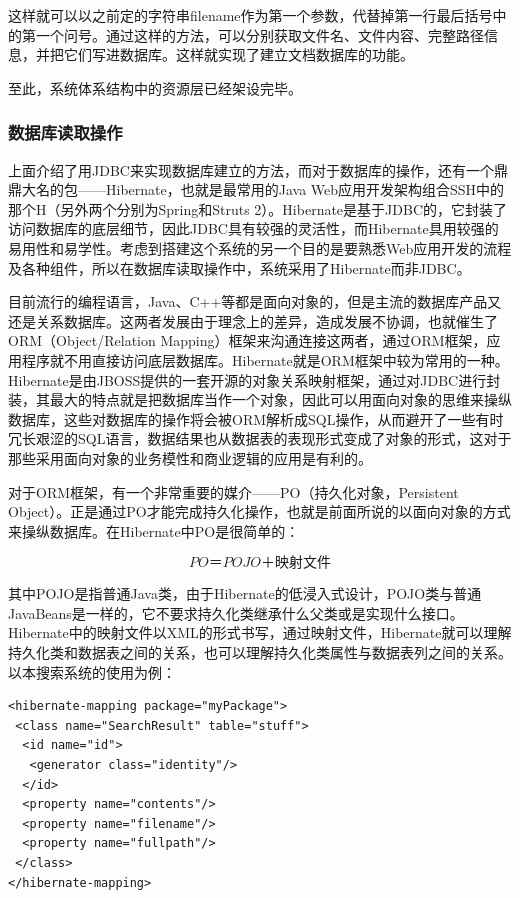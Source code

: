 \documentclass[12pt,a4paper]{article}
\begin{document}
	这样就可以以之前定的字符串filename作为第一个参数，代替掉第一行最后括号中的第一个问号。通过这样的方法，可以分别获取文件名、文件内容、完整路径信息，并把它们写进数据库。这样就实现了建立文档数据库的功能。
	
	至此，系统体系结构中的资源层已经架设完毕。

		\subsubsection{数据库读取操作}
	上面介绍了用JDBC来实现数据库建立的方法，而对于数据库的操作，还有一个鼎鼎大名的包——Hibernate，也就是最常用的Java Web应用开发架构组合SSH中的那个H（另外两个分别为Spring和Struts 2）。Hibernate是基于JDBC的，它封装了访问数据库的底层细节，因此JDBC具有较强的灵活性，而Hibernate具用较强的易用性和易学性。考虑到搭建这个系统的另一个目的是要熟悉Web应用开发的流程及各种组件，所以在数据库读取操作中，系统采用了Hibernate而非JDBC。
	
	目前流行的编程语言，Java、C++等都是面向对象的，但是主流的数据库产品又还是关系数据库\cite{li2008}。这两者发展由于理念上的差异，造成发展不协调，也就催生了ORM（Object/Relation Mapping）框架来沟通连接这两者，通过ORM框架，应用程序就不用直接访问底层数据库。Hibernate就是ORM框架中较为常用的一种。Hibernate是由JBOSS提供的一套开源的对象关系映射框架，通过对JDBC进行封装，其最大的特点就是把数据库当作一个对象，因此可以用面向对象的思维来操纵数据库，这些对数据库的操作将会被ORM解析成SQL操作，从而避开了一些有时冗长艰涩的SQL语言，数据结果也从数据表的表现形式变成了对象的形式，这对于那些采用面向对象的业务模性和商业逻辑的应用是有利的。
	
	对于ORM框架，有一个非常重要的媒介——PO（持久化对象，Persistent Object）。正是通过PO才能完成持久化操作，也就是前面所说的以面向对象的方式来操纵数据库。在Hibernate中PO是很简单的：

	$$ PO ＝ POJO ＋ 映射文件 $$

	其中POJO是指普通Java类，由于Hibernate的低浸入式设计，POJO类与普通JavaBeans是一样的，它不要求持久化类继承什么父类或是实现什么接口。Hibernate中的映射文件以XML的形式书写，通过映射文件，Hibernate就可以理解持久化类和数据表之间的关系，也可以理解持久化类属性与数据表列之间的关系。以本搜索系统的使用为例：
	
\lstset{language=XML,frame=lines}
\begin{lstlisting}
<hibernate-mapping package="myPackage">
 <class name="SearchResult" table="stuff">
  <id name="id">
   <generator class="identity"/>
  </id>
  <property name="contents"/>
  <property name="filename"/>
  <property name="fullpath"/>
 </class>
</hibernate-mapping>
\end{lstlisting}	
\end{document}
